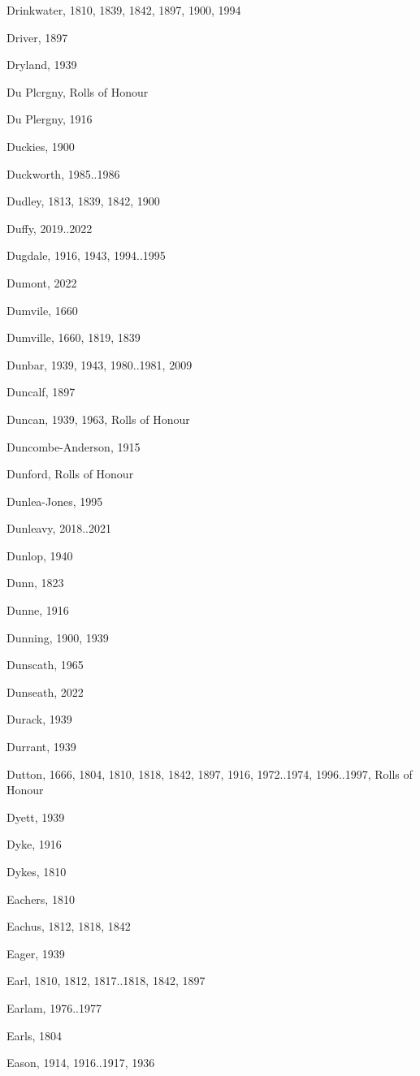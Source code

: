 \begin{theindex}
\item Drinkwater, 1810, 1839, 1842, 1897, 1900, 1994
\item Driver, 1897
\item Dryland, 1939
\item Du Plcrgny, Rolls of Honour
\item Du Plergny, 1916
\item Duckies, 1900
\item Duckworth, 1985..1986
\item Dudley, 1813, 1839, 1842, 1900
\item Duffy, 2019..2022
\item Dugdale, 1916, 1943, 1994..1995
\item Dumont, 2022
\item Dumvile, 1660
\item Dumville, 1660, 1819, 1839
\item Dunbar, 1939, 1943, 1980..1981, 2009
\item Duncalf, 1897
\item Duncan, 1939, 1963, Rolls of Honour
\item Duncombe-Anderson, 1915
\item Dunford, Rolls of Honour
\item Dunlea-Jones, 1995
\item Dunleavy, 2018..2021
\item Dunlop, 1940
\item Dunn, 1823
\item Dunne, 1916
\item Dunning, 1900, 1939
\item Dunscath, 1965
\item Dunseath, 2022
\item Durack, 1939
\item Durrant, 1939
\item Dutton, 1666, 1804, 1810, 1818, 1842, 1897, 1916, 1972..1974, 1996..1997, Rolls of Honour
\item Dyett, 1939
\item Dyke, 1916
\item Dykes, 1810
\item Eachers, 1810
\item Eachus, 1812, 1818, 1842
\item Eager, 1939
\item Earl, 1810, 1812, 1817..1818, 1842, 1897
\item Earlam, 1976..1977
\item Earls, 1804
\item Eason, 1914, 1916..1917, 1936

\end{theindex}
